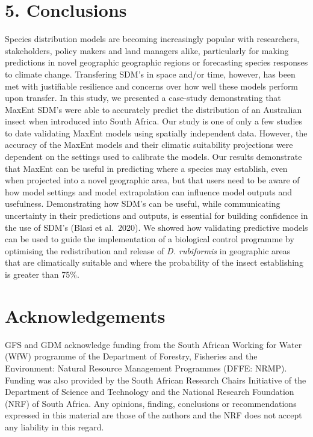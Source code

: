 \documentclass[12pt,]{article}
\begin{document}
\hypertarget{conclusions}{%
\section{5. Conclusions}\label{conclusions}}

Species distribution models are becoming increasingly popular with
researchers, stakeholders, policy makers and land managers alike,
particularly for making predictions in novel geographic geographic
regions or forecasting species responses to climate change. Transfering
SDM's in space and/or time, however, has been met with justifiable
resilience and concerns over how well these models perform upon
transfer. In this study, we presented a case-study demonstrating that
MaxEnt SDM's were able to accurately predict the distribution of an
Australian insect when introduced into South Africa. Our study is one of
only a few studies to date validating MaxEnt models using spatially
independent data. However, the accuracy of the MaxEnt models and their
climatic suitability projections were dependent on the settings used to
calibrate the models. Our results demonstrate that MaxEnt can be useful
in predicting where a species may establish, even when projected into a
novel geographic area, but that users need to be aware of how model
settings and model extrapolation can influence model outputs and
usefulness. Demonstrating how SDM's can be useful, while communicating
uncertainty in their predictions and outputs, is essential for building
confidence in the use of SDM's (Blasi et al.~2020). We showed how
validating predictive models can be used to guide the implementation of
a biological control programme by optimising the redistribution and
release of \emph{D. rubiformis} in geographic areas that are
climatically suitable and where the probability of the insect
establishing is greater than 75\%.

\hypertarget{acknowledgements}{%
\section{Acknowledgements}\label{acknowledgements}}

GFS and GDM acknowledge funding from the South African Working for Water
(WfW) programme of the Department of Forestry, Fisheries and the
Environment: Natural Resource Management Programmes (DFFE: NRMP).
Funding was also provided by the South African Research Chairs
Initiative of the Department of Science and Technology and the National
Research Foundation (NRF) of South Africa. Any opinions, finding,
conclusions or recommendations expressed in this material are those of
the authors and the NRF does not accept any liability in this regard.
\end{document}
